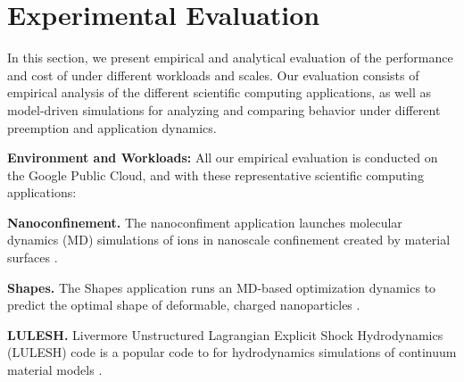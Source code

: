\vspace*{\subsecspace}
\section{Experimental Evaluation}
\label{sec:eval}

In this section, we present empirical and analytical evaluation of the performance and cost of \sysname under different workloads and scales. 
Our evaluation consists of empirical analysis of the different scientific computing applications, as well as model-driven simulations for analyzing and comparing \sysname behavior under different preemption and application dynamics. 


\noindent \textbf{Environment and Workloads:} All our empirical evaluation is conducted on the Google Public Cloud, and with these representative scientific computing applications: 

\noindent \textbf{Nanoconfinement.}
The nanoconfiment application launches molecular dynamics (MD) simulations of ions in nanoscale confinement created by material surfaces \cite{jyto,kadupitiya2017}.

\noindent \textbf{Shapes.} The Shapes application runs an MD-based optimization dynamics to predict the optimal shape of deformable, charged nanoparticles \cite{jto1,jjzo1}. 

\noindent \textbf{LULESH.} Livermore Unstructured Lagrangian Explicit Shock Hydrodynamics (LULESH) code is a popular code to for hydrodynamics simulations of continuum material models \cite{IPDPS13:LULESH,LULESH2:changes}. 

